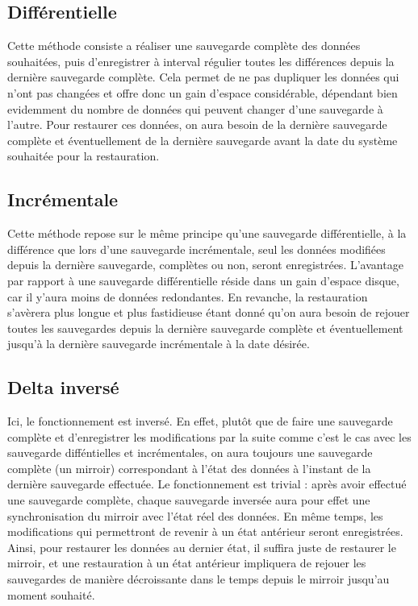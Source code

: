 \documentclass[a4paper,11pt]{report}
\begin{document}
\subsection{Différentielle}
Cette méthode consiste a réaliser une sauvegarde complète des données souhaitées, puis d'enregistrer à interval régulier toutes les différences depuis la dernière sauvegarde complète.
Cela permet de ne pas dupliquer les données qui n'ont pas changées et offre donc un gain d'espace considérable, dépendant bien evidemment du nombre de données qui peuvent changer d'une sauvegarde à l'autre.
Pour restaurer ces données, on aura besoin de la dernière sauvegarde complète et éventuellement de la dernière sauvegarde avant la date du système souhaitée pour la restauration.

\subsection{Incrémentale}
Cette méthode repose sur le même principe qu'une sauvegarde différentielle, à la différence que lors d'une sauvegarde incrémentale, seul les données modifiées depuis la dernière sauvegarde, complètes ou non, seront enregistrées.
L'avantage par rapport à une sauvegarde différentielle réside dans un gain d'espace disque, car il y'aura moins de données redondantes. En revanche, la restauration s'avèrera plus longue et plus fastidieuse étant donné qu'on aura besoin de rejouer toutes les sauvegardes depuis la dernière sauvegarde complète et éventuellement jusqu'à la dernière sauvegarde incrémentale à la date désirée.

\subsection{Delta inversé}
Ici, le fonctionnement est inversé.
En effet, plutôt que de faire une sauvegarde complète et d'enregistrer les modifications par la suite comme c'est le cas avec les sauvegarde difféntielles et incrémentales, on aura toujours une sauvegarde complète (un mirroir) correspondant à l'état des données à l'instant de la dernière sauvegarde effectuée.
Le fonctionnement est trivial : après avoir effectué une sauvegarde complète, chaque sauvegarde inversée aura pour effet une synchronisation du mirroir avec l'état réel des données. En même temps, les modifications qui permettront de revenir à un état antérieur seront enregistrées.
Ainsi, pour restaurer les données au dernier état, il suffira juste de restaurer le mirroir, et une restauration à un état antérieur impliquera de rejouer les sauvegardes de manière décroissante dans le temps depuis le mirroir jusqu'au moment souhaité.
\end{document}
